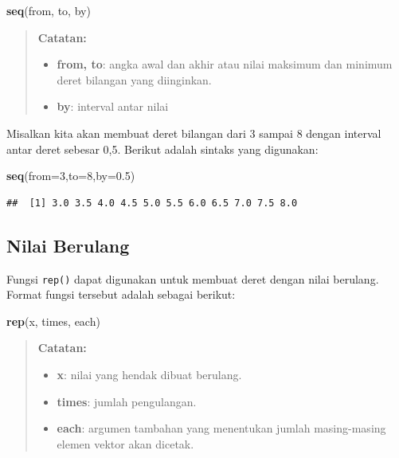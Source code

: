 \documentclass[
]{book}
\newenvironment{Shaded}{\begin{snugshade}}{\end{snugshade}}
\newcommand{\AttributeTok}[1]{\textcolor[rgb]{0.13,0.29,0.53}{#1}}
\newcommand{\DecValTok}[1]{\textcolor[rgb]{0.00,0.00,0.81}{#1}}
\newcommand{\FloatTok}[1]{\textcolor[rgb]{0.00,0.00,0.81}{#1}}
\newcommand{\FunctionTok}[1]{\textcolor[rgb]{0.13,0.29,0.53}{\textbf{#1}}}
\newcommand{\NormalTok}[1]{#1}
\providecommand{\tightlist}{%
  \setlength{\itemsep}{0pt}\setlength{\parskip}{0pt}}
\theoremstyle{definition}
\theoremstyle{definition}
\theoremstyle{definition}
\theoremstyle{definition}
\theoremstyle{remark}
\begin{document}
\begin{Shaded}
\begin{Highlighting}[]
\FunctionTok{seq}\NormalTok{(from, to, by)}
\end{Highlighting}
\end{Shaded}

\begin{quote}
\textbf{Catatan:}

\begin{itemize}
\tightlist
\item
  \textbf{from, to}: angka awal dan akhir atau nilai maksimum dan minimum deret bilangan yang diinginkan.
\item
  \textbf{by}: interval antar nilai
\end{itemize}
\end{quote}

Misalkan kita akan membuat deret bilangan dari 3 sampai 8 dengan interval antar deret sebesar 0,5. Berikut adalah sintaks yang digunakan:

\begin{Shaded}
\begin{Highlighting}[]
\FunctionTok{seq}\NormalTok{(}\AttributeTok{from=}\DecValTok{3}\NormalTok{,}\AttributeTok{to=}\DecValTok{8}\NormalTok{,}\AttributeTok{by=}\FloatTok{0.5}\NormalTok{)}
\end{Highlighting}
\end{Shaded}

\begin{verbatim}
##  [1] 3.0 3.5 4.0 4.5 5.0 5.5 6.0 6.5 7.0 7.5 8.0
\end{verbatim}

\hypertarget{repseq}{%
\subsection{Nilai Berulang}\label{repseq}}

Fungsi \texttt{rep()} dapat digunakan untuk membuat deret dengan nilai berulang. Format fungsi tersebut adalah sebagai berikut:

\begin{Shaded}
\begin{Highlighting}[]
\FunctionTok{rep}\NormalTok{(x, times, each)}
\end{Highlighting}
\end{Shaded}

\begin{quote}
\textbf{Catatan:}

\begin{itemize}
\tightlist
\item
  \textbf{x}: nilai yang hendak dibuat berulang.
\item
  \textbf{times}: jumlah pengulangan.
\item
  \textbf{each}: argumen tambahan yang menentukan jumlah masing-masing elemen vektor akan dicetak.
\end{itemize}
\end{quote}
\end{document}
